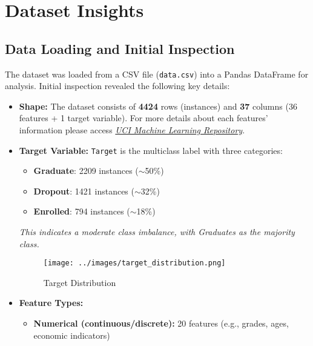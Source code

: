 \documentclass[twoside,final]{hcmut-report}
\begin{document}
\section{Dataset Insights}
\subsection{Data Loading and Initial Inspection}

The dataset was loaded from a CSV file (\texttt{data.csv}) into a Pandas DataFrame for analysis. Initial inspection revealed the following key details:

\begin{itemize}[parsep=0pt, itemsep=0pt, topsep=0pt]
  \item \textbf{Shape:} The dataset consists of \textbf{4424} rows (instances) and \textbf{37} columns (36 features + 1 target variable). For more details about each features' information please access \href{https://archive.ics.uci.edu/dataset/697/predict+students+dropout+and+academic+success}{\textit{UCI Machine Learning Repository}}.
  \item \textbf{Target Variable:} \texttt{Target} is the multiclass label with three categories:\\
        \begin{minipage}{0.48\textwidth}
          \begin{itemize}
            \item \textbf{Graduate}: 2209 instances ($\sim$50\%)
            \item \textbf{Dropout}: 1421 instances ($\sim$32\%)
            \item \textbf{Enrolled}: 794 instances ($\sim$18\%)
          \end{itemize}
          \textit{This indicates a moderate class imbalance, with Graduates as the majority class.}
        \end{minipage}
        \hfill
        \begin{minipage}{0.48\textwidth}
          \begin{figure}[H]
            \centering
            \texttt{[image: ../images/target\_distribution.png]}
            \caption{Target Distribution}
            \label{target-distribution}
          \end{figure}
        \end{minipage}
  \item \textbf{Feature Types:}
        \begin{itemize}
          \item \textbf{Numerical (continuous/discrete):} 20 features (e.g., grades, ages, economic indicators)

\end{itemize}
\end{itemize}
\end{document}
